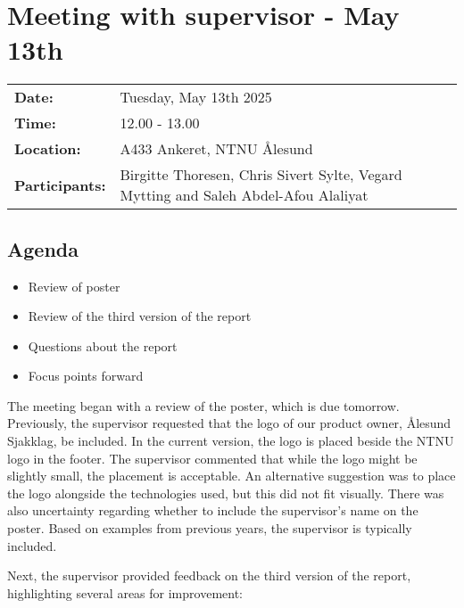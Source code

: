 \section{Meeting with supervisor - May 13th}
\begin{tabular}{ll}
    \textbf{Date:} & Tuesday, May 13th 2025 \\
    \textbf{Time:} & 12.00 - 13.00\\
    \textbf{Location:} & A433 Ankeret, NTNU Ålesund \\
    \textbf{Participants:} & Birgitte Thoresen, Chris Sivert Sylte, Vegard Mytting and Saleh Abdel-Afou Alaliyat\\
\end{tabular}

\vspace{0.5cm}

\subsection{Agenda}

\begin{itemize} 
    \item Review of poster
    \item Review of the third version of the report
    \item Questions about the report
    \item Focus points forward
\end{itemize}

The meeting began with a review of the poster, which is due tomorrow. Previously, the supervisor requested that the logo of our product owner, Ålesund Sjakklag, be included. In the current version, the logo is placed beside the NTNU logo in the footer. The supervisor commented that while the logo might be slightly small, the placement is acceptable. An alternative suggestion was to place the logo alongside the technologies used, but this did not fit visually. There was also uncertainty regarding whether to include the supervisor’s name on the poster. Based on examples from previous years, the supervisor is typically included.

Next, the supervisor provided feedback on the third version of the report, highlighting several areas for improvement:


